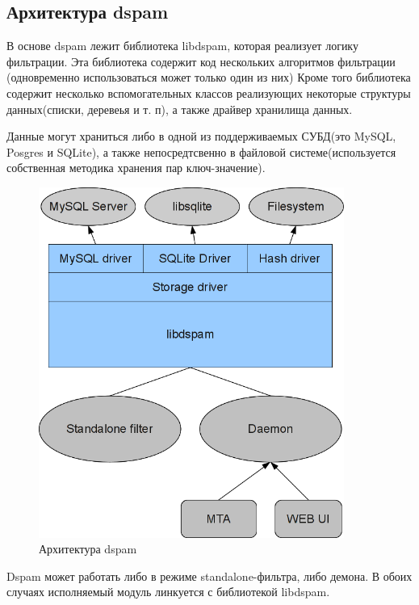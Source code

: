 
\subsection{Архитектура dspam}
В основе dspam лежит библиотека libdspam, которая реализует логику фильтрации.
Эта библиотека содержит код нескольких алгоритмов фильтрации (одновременно использоваться может только один из них)
Кроме того библиотека содержит несколько вспомогательных классов реализующих некоторые структуры данных(списки, деревеья и т. п), а также драйвер хранилища данных.

Данные могут храниться либо в одной из поддерживаемых СУБД(это MySQL, Posgres и SQLite), а также непосредтсвенно в файловой системе(используется собственная методика хранения пар ключ-значение).

\begin{figure}[h]
\begin{center}
\includegraphics[width=10cm]{img/dspamarch}
\end{center}
\caption{Архитектура dspam}
\label{dspamarch}
\end{figure}

Dspam может работать либо в режиме standalone-фильтра, либо демона. В обоих случаях
исполняемый модуль линкуется с библиотекой libdspam.

